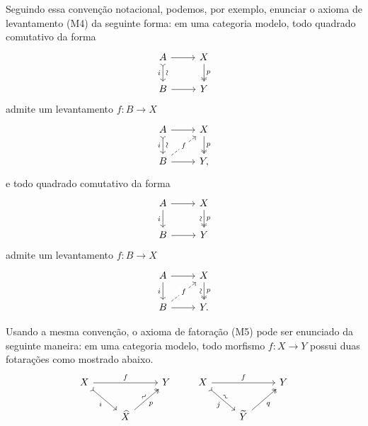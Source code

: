 \begin{obs}
  Seguindo essa convenção notacional, podemos, por exemplo, enunciar o axioma de levantamento (M4) da seguinte forma: em uma categoria modelo, todo quadrado comutativo da forma
  \begin{displaymath}
    \begin{tikzcd}
      A
      \arrow[r]
      \arrow[d, tail, "i" swap, "\sim" sloped]
      & X
      \arrow[d, two heads, "p"]
      \\ B
      \arrow[r]
      & Y
    \end{tikzcd}
  \end{displaymath}
  admite um levantamento $f: B \to X$
  \begin{displaymath}
    \begin{tikzcd}
      A
      \arrow[r]
      \arrow[d, tail, "i" swap, "\sim" sloped]
      & X
      \arrow[d, two heads, "p"]
      \\ B
      \arrow[r]
      \arrow[ru, dashed, "f" description]
      & Y,
    \end{tikzcd}
  \end{displaymath}
  e todo quadrado comutativo da forma
  \begin{displaymath}
    \begin{tikzcd}
      A
      \arrow[r]
      \arrow[d, "i" swap]
      & X
      \arrow[d, two heads, "\sim" {swap, sloped}, "p"]
      \\ B
      \arrow[r]
      & Y
    \end{tikzcd}
  \end{displaymath}
  admite um levantamento $f: B \to X$
  \begin{displaymath}
    \begin{tikzcd}
      A
      \arrow[r]
      \arrow[d, "i" swap]
      & X
      \arrow[d, two heads, "\sim" {swap, sloped}, "p"]
      \\ B
      \arrow[r]
      \arrow[ru, dashed, "f" description]
      & Y.
    \end{tikzcd}
  \end{displaymath}

  Usando a mesma convenção, o axioma de fatoração (M5) pode ser enunciado da seguinte maneira: em uma categoria modelo, todo morfismo $f: X \to Y$ possui duas fotarações como mostrado abaixo.
  \begin{displaymath}
    \begin{tikzcd}
      X
      \arrow[rr, "f"]
      \arrow[rd, tail, "i" swap]
      & & Y
      \\ & \widehat{X}
      \arrow[ru, two heads, "p" {swap}, "\sim" {sloped}]
    \end{tikzcd}
    \qquad
    \begin{tikzcd}
      X
      \arrow[rr, "f"]
      \arrow[rd, tail, "j" {swap}, "\sim" {sloped}]
      & & Y
      \\ & \widetilde{Y}
      \arrow[ru, two heads, "q" swap]
    \end{tikzcd}
  \end{displaymath}
\end{obs}

